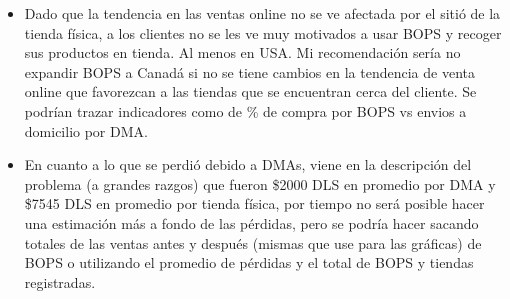 \documentclass[
  landscape]{article}
\begin{document}
\begin{itemize}
\item
  Dado que la tendencia en las ventas online no se ve afectada por el
  sitió de la tienda física, a los clientes no se les ve muy motivados a
  usar BOPS y recoger sus productos en tienda. Al menos en USA. Mi
  recomendación sería no expandir BOPS a Canadá si no se tiene cambios
  en la tendencia de venta online que favorezcan a las tiendas que se
  encuentran cerca del cliente. Se podrían trazar indicadores como de \%
  de compra por BOPS vs envios a domicilio por DMA.
\item
  En cuanto a lo que se perdió debido a DMAs, viene en la descripción
  del problema (a grandes razgos) que fueron \$2000 DLS en promedio por
  DMA y \$7545 DLS en promedio por tienda física, por tiempo no será
  posible hacer una estimación más a fondo de las pérdidas, pero se
  podría hacer sacando totales de las ventas antes y después (mismas que
  use para las gráficas) de BOPS o utilizando el promedio de pérdidas y
  el total de BOPS y tiendas registradas.
\end{itemize}
\end{document}
